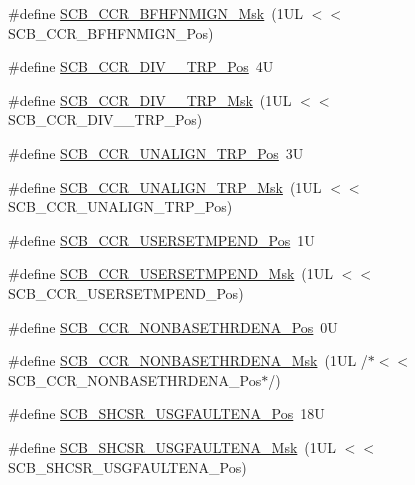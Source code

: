 \begin{DoxyCompactItemize}
\item 
\#define \hyperlink{group___c_m_s_i_s___s_c_b_ga89a28cc31cfc7d52d9d7a8fcc69c7eac}{S\+C\+B\+\_\+\+C\+C\+R\+\_\+\+B\+F\+H\+F\+N\+M\+I\+G\+N\+\_\+\+Msk}~(1\+U\+L $<$$<$ S\+C\+B\+\_\+\+C\+C\+R\+\_\+\+B\+F\+H\+F\+N\+M\+I\+G\+N\+\_\+\+Pos)
\item 
\#define \hyperlink{group___c_m_s_i_s___s_c_b_gac8d512998bb8cd9333fb7627ddf59bba}{S\+C\+B\+\_\+\+C\+C\+R\+\_\+\+D\+I\+V\+\_\+\_\+\+T\+R\+P\+\_\+\+Pos}~4U
\item 
\#define \hyperlink{group___c_m_s_i_s___s_c_b_gabb9aeac71b3abd8586d0297070f61dcb}{S\+C\+B\+\_\+\+C\+C\+R\+\_\+\+D\+I\+V\+\_\+\_\+\+T\+R\+P\+\_\+\+Msk}~(1\+U\+L $<$$<$ S\+C\+B\+\_\+\+C\+C\+R\+\_\+\+D\+I\+V\+\_\+\_\+\+T\+R\+P\+\_\+\+Pos)
\item 
\#define \hyperlink{group___c_m_s_i_s___s_c_b_gac4e4928b864ea10fc24dbbc57d976229}{S\+C\+B\+\_\+\+C\+C\+R\+\_\+\+U\+N\+A\+L\+I\+G\+N\+\_\+\+T\+R\+P\+\_\+\+Pos}~3U
\item 
\#define \hyperlink{group___c_m_s_i_s___s_c_b_ga68c96ad594af70c007923979085c99e0}{S\+C\+B\+\_\+\+C\+C\+R\+\_\+\+U\+N\+A\+L\+I\+G\+N\+\_\+\+T\+R\+P\+\_\+\+Msk}~(1\+U\+L $<$$<$ S\+C\+B\+\_\+\+C\+C\+R\+\_\+\+U\+N\+A\+L\+I\+G\+N\+\_\+\+T\+R\+P\+\_\+\+Pos)
\item 
\#define \hyperlink{group___c_m_s_i_s___s_c_b_ga789e41f45f59a8cd455fd59fa7652e5e}{S\+C\+B\+\_\+\+C\+C\+R\+\_\+\+U\+S\+E\+R\+S\+E\+T\+M\+P\+E\+N\+D\+\_\+\+Pos}~1U
\item 
\#define \hyperlink{group___c_m_s_i_s___s_c_b_ga4cf59b6343ca962c80e1885710da90aa}{S\+C\+B\+\_\+\+C\+C\+R\+\_\+\+U\+S\+E\+R\+S\+E\+T\+M\+P\+E\+N\+D\+\_\+\+Msk}~(1\+U\+L $<$$<$ S\+C\+B\+\_\+\+C\+C\+R\+\_\+\+U\+S\+E\+R\+S\+E\+T\+M\+P\+E\+N\+D\+\_\+\+Pos)
\item 
\#define \hyperlink{group___c_m_s_i_s___s_c_b_gab4615f7deb07386350365b10240a3c83}{S\+C\+B\+\_\+\+C\+C\+R\+\_\+\+N\+O\+N\+B\+A\+S\+E\+T\+H\+R\+D\+E\+N\+A\+\_\+\+Pos}~0U
\item 
\#define \hyperlink{group___c_m_s_i_s___s_c_b_gafe0f6be81b35d72d0736a0a1e3b4fbb3}{S\+C\+B\+\_\+\+C\+C\+R\+\_\+\+N\+O\+N\+B\+A\+S\+E\+T\+H\+R\+D\+E\+N\+A\+\_\+\+Msk}~(1\+U\+L /$\ast$$<$$<$ S\+C\+B\+\_\+\+C\+C\+R\+\_\+\+N\+O\+N\+B\+A\+S\+E\+T\+H\+R\+D\+E\+N\+A\+\_\+\+Pos$\ast$/)
\item 
\#define \hyperlink{group___c_m_s_i_s___s_c_b_gae71949507636fda388ec11d5c2d30b52}{S\+C\+B\+\_\+\+S\+H\+C\+S\+R\+\_\+\+U\+S\+G\+F\+A\+U\+L\+T\+E\+N\+A\+\_\+\+Pos}~18U
\item 
\#define \hyperlink{group___c_m_s_i_s___s_c_b_ga056fb6be590857bbc029bed48b21dd79}{S\+C\+B\+\_\+\+S\+H\+C\+S\+R\+\_\+\+U\+S\+G\+F\+A\+U\+L\+T\+E\+N\+A\+\_\+\+Msk}~(1\+U\+L $<$$<$ S\+C\+B\+\_\+\+S\+H\+C\+S\+R\+\_\+\+U\+S\+G\+F\+A\+U\+L\+T\+E\+N\+A\+\_\+\+Pos)
$$
\end{DoxyCompactItemize}
